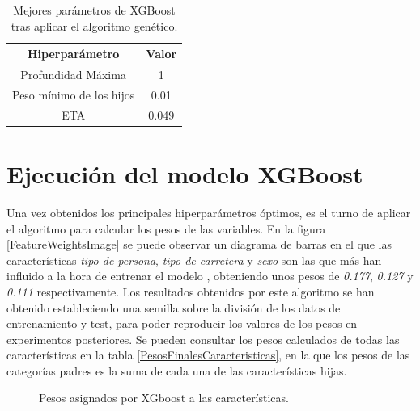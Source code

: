   \begin{table}[h]
      \small
      \centering
          \begin{tabular}{ |c|c| } 
              \hline
              \textbf{Hiperparámetro} & \textbf{Valor}\\
              \hline
                  Profundidad Máxima & 1 \\
                  Peso mínimo de los hijos & 0.01 \\ 
                  ETA & 0.049 \\ 
              \hline

          \end{tabular}
      \caption{Mejores parámetros de XGBoost tras aplicar el algoritmo genético.}
      \label{BestGASolutionTable}
  \end{table}


\section{Ejecución del modelo XGBoost}

  Una vez obtenidos los principales hiperparámetros óptimos, es el turno de aplicar el algoritmo  para calcular los pesos de las variables. En la figura \eqref{FeatureWeightsImage} se puede observar un diagrama de barras en el que las características \textit{tipo de persona}, \textit{tipo de carretera} y \textit{sexo} son las que más han influido a la hora de entrenar el modelo , obteniendo unos pesos de \textit{0.177}, \textit{0.127} y \textit{0.111} respectivamente. Los resultados obtenidos por este algoritmo se han obtenido estableciendo una semilla sobre la división de los datos de entrenamiento y test, para poder reproducir los valores de los pesos en experimentos posteriores. Se pueden consultar los pesos calculados de todas las características en la tabla \eqref{PesosFinalesCaracteristicas}, en la que los pesos de las categorías padres es la suma de cada una de las características hijas.


  \begin{figure}[h]
      \centering
      
      \caption{Pesos asignados por XGboost a las características.}
      \label{FeatureWeightsImage}
   \end{figure}


